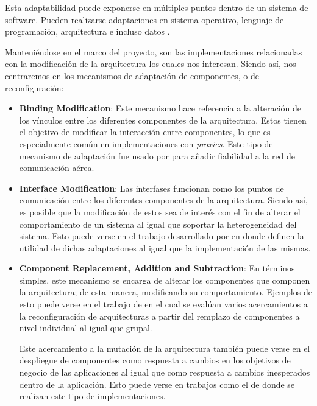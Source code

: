 Esta adaptabilidad puede exponerse en múltiples puntos dentro de un sistema de software. Pueden realizarse adaptaciones en sistema operativo, lenguaje de programación, arquitectura e incluso datos \cite{lalanda_diaconescu_mccann_2014}. 

Manteniéndose en el marco del proyecto, son las implementaciones relacionadas con la modificación de la arquitectura los cuales nos interesan. Siendo así, nos centraremos en los mecanismos de adaptación de componentes, o de reconfiguración:

\begin{itemize}
    \item \textbf{Binding Modification}: Este mecanismo hace referencia a la alteración de los vínculos entre los diferentes componentes de la arquitectura. Estos tienen el objetivo de modificar la interacción entre componentes, lo que es especialmente común en implementaciones con \textit{proxies}. Este tipo de mecanismo de adaptación fue usado por \citeauthor{Kabashkin_2017} \citeyear{Kabashkin_2017} para añadir fiabilidad a la red de comunicación aérea.

    \item \textbf{Interface Modification}: Las interfases funcionan como los puntos de comunicación entre los diferentes componentes de la arquitectura. Siendo así, es posible que la modificación de estos sea de interés con el fin de alterar el comportamiento de un sistema al igual que soportar la heterogeneidad del sistema. Esto puede verse en el trabajo desarrollado por \citeauthor{Liu_2004} \citeyear{Liu_2004} en donde definen la utilidad de dichas adaptaciones al igual que la implementación de las mismas.

    \item \textbf{Component Replacement, Addition and Subtraction}: En términos simples, este mecanismo se encarga de alterar los componentes que componen la arquitectura; de esta manera, modificando su comportamiento. Ejemplos de esto puede verse en el trabajo de \citeauthor{Huynh_2019} \citeyear{Huynh_2019} en el cual se evalúan varios acercamientos a la reconfiguración de arquitecturas a partir del remplazo de componentes a nivel individual al igual que grupal. 
    
    Este acercamiento a la mutación de la arquitectura también puede verse en el despliegue de componentes como respuesta a cambios en los objetivos de negocio de las aplicaciones al igual que como respuesta a cambios inesperados dentro de la aplicación. Esto puede verse en trabajos como el de \citeauthor{Patouni_2006} \citeyear{Patouni_2006} donde se realizan este tipo de implementaciones. 

\end{itemize}

